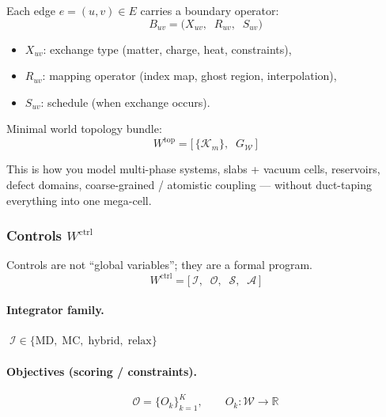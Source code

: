 \documentclass[11pt, a4paper, oneside]{article}
\theoremstyle{definition}
\theoremstyle{remark}
\newcommand{\R}{\mathbb{R}}
\begin{document}
Each edge $e = (u,v) \in E$ carries a boundary operator:
\begin{equation}
  B_{uv} =
  \bigl(
    X_{uv},\;\;
    R_{uv},\;\;
    S_{uv}
  \bigr)
  \label{eq:boundary-operator}
\end{equation}
%
\begin{itemize}
  \item $X_{uv}$: exchange type (matter, charge, heat, constraints),
  \item $R_{uv}$: mapping operator (index map, ghost region,
        interpolation),
  \item $S_{uv}$: schedule (when exchange occurs).
\end{itemize}

\noindent Minimal world topology bundle:
\begin{equation}
  W^{\mathrm{top}} =
  \bigl[\,
    \{\mathcal{K}_m\},\;\;
    G_{\mathcal{W}}
  \,\bigr]
  \label{eq:world-top}
\end{equation}

\noindent
This is how you model multi-phase systems, slabs + vacuum cells,
reservoirs, defect domains, coarse-grained / atomistic coupling —
without duct-taping everything into one mega-cell.

\subsubsection{Controls \texorpdfstring{$W^{\mathrm{ctrl}}$}{Wctrl}}
\label{sec:world-ctrl}

Controls are not ``global variables''; they are a formal program.
%
\begin{equation}
  W^{\mathrm{ctrl}} =
  \bigl[\,
    \mathcal{I},\;\;
    \mathcal{O},\;\;
    \mathcal{S},\;\;
    \mathcal{A}
  \,\bigr]
  \label{eq:world-ctrl}
\end{equation}

\paragraph{Integrator family.}
$\;\mathcal{I} \in \{\text{MD},\;\text{MC},\;\text{hybrid},\;\text{relax}\}$

\paragraph{Objectives (scoring / constraints).}
\begin{equation}
  \mathcal{O} = \{O_k\}_{k=1}^{K},
  \qquad O_k : \mathcal{W} \to \R
  \label{eq:objectives}
\end{equation}
\end{document}

